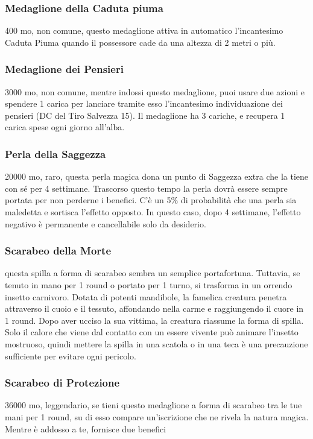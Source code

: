 \begin{multicols}{2}
	\subsubsection*{Medaglione della Caduta piuma}
	400 mo, non comune, questo medaglione attiva in automatico l'incantesimo Caduta Piuma quando il possessore cade da una altezza di 2 metri o più.

	\subsubsection*{Medaglione dei Pensieri}
	3000 mo, non comune, mentre indossi questo medaglione, puoi usare due azioni e spendere 1 carica per lanciare tramite esso l'incantesimo individuazione dei pensieri (DC del Tiro Salvezza 15). Il medaglione ha 3 cariche, e recupera 1 carica spese ogni giorno all'alba.

	\subsubsection*{Perla della Saggezza}
	20000 mo, raro, questa perla magica dona un punto di Saggezza extra che la tiene con sé per 4 settimane. Trascorso questo tempo la perla dovrà essere sempre portata per non perderne i benefici. C'è un 5\% di probabilità che una perla sia maledetta e sortisca l’effetto opposto. In questo caso, dopo 4 settimane, l’effetto negativo è permanente e cancellabile solo da desiderio.

	\subsubsection*{Scarabeo della Morte}
	questa spilla a forma di scarabeo sembra un semplice portafortuna. Tuttavia, se tenuto in mano per 1 round o portato per 1 turno, si trasforma in un orrendo insetto carnivoro. Dotata di potenti mandibole, la famelica creatura penetra attraverso il cuoio e il tessuto, affondando nella carme e raggiungendo il cuore in 1 round. Dopo aver ucciso la sua vittima, la creatura riassume la forma di spilla. Solo il calore che viene dal contatto con un essere vivente può animare l’insetto mostruoso, quindi mettere la spilla in una scatola o in una teca è una precauzione sufficiente per evitare ogni pericolo.

	\subsubsection*{Scarabeo di Protezione}
	36000 mo, leggendario, se tieni questo medaglione a forma di scarabeo tra le tue mani per 1 round, su di esso compare un'iscrizione che ne rivela la natura magica. Mentre è addosso a te, fornisce due benefici


\end{multicols}
